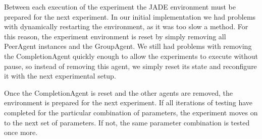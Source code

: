 Between each execution of the experiment the JADE environment must be prepared for the next experiment. In our initial implementation we had problems with dynamically restarting the environment, as it was too slow a method. For this reason, the experiment environment is reset by simply removing all PeerAgent instances and the GroupAgent. We still had problems with removing the CompletionAgent quickly enough to allow the experiments to execute without pause, so instead of removing this agent, we simply reset its state and reconfigure it with the next experimental setup.

Once the CompletionAgent is reset and the other agents are removed, the environment is prepared for the next experiment. If all iterations of testing have completed for the particular combination of parameters, the experiment moves on to the next set of parameters. If not, the same parameter combination is tested once more.